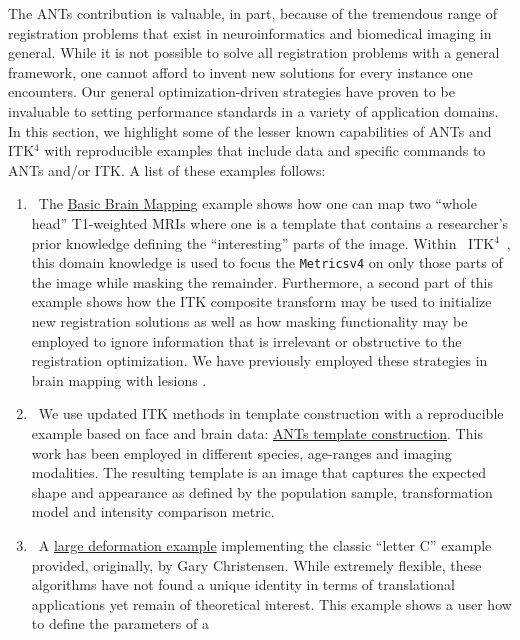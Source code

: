 \documentclass{frontiersSCNS}
\newcommand{\tk}{~ITK$^{\text{4}}$~}
\begin{document}
The ANTs contribution is valuable, in part, because of the tremendous range of
registration problems that exist in neuroinformatics and biomedical
imaging in general.  While it is not possible to solve all registration problems with a
general framework, one cannot afford to invent new
solutions for every instance one encounters.  Our general optimization-driven strategies have
proven to be invaluable to setting performance standards in a variety
of application domains.   In this section, we highlight some of the
lesser known capabilities of ANTs and ITK$^4$ with reproducible
examples that include data and specific commands to ANTs and/or ITK.  
A list of these examples follows:
\begin{enumerate}
  \item~The \href{http://stnava.github.io/BasicBrainMapping/}{Basic
      Brain Mapping} example shows how one can map two ``whole head''
    T1-weighted MRIs where one is a template that contains a researcher's prior
    knowledge defining the ``interesting'' parts of the image.  Within
    \tk, this domain knowledge is used to focus the \texttt{Metricsv4}
    on only those parts of the image while masking the remainder.
    Furthermore, a second part of this example shows how the ITK
    composite transform may be used to initialize new registration
    solutions as well as how masking functionality may be employed to
    ignore information that is irrelevant or obstructive to the
    registration optimization.  We have previously employed these
    strategies in brain mapping with lesions \cite{Avants2008,Kim2008,Kim2010,Tustison2011a,Kim2013}. 
  \item~We use updated ITK methods in template construction with a
    reproducible example based on face and brain data:
    \href{https://github.com/ntustison/TemplateBuildingExample}{ANTs
      template construction}.  This work has been employed in
    different species, age-ranges and imaging modalities.  The
    resulting template is an image that captures the expected shape
    and appearance as defined by the population sample, transformation
    model and intensity comparison metric.
  \item~A \href{http://stnava.github.io/C/}{large deformation
      example} implementing the classic ``letter C'' example provided,
     originally, by Gary Christensen.  While extremely flexible, these
     algorithms have not found a unique identity in terms of
     translational applications yet remain of theoretical interest.
     This example shows a user how to define the parameters of a

\end{enumerate}
\end{document}
